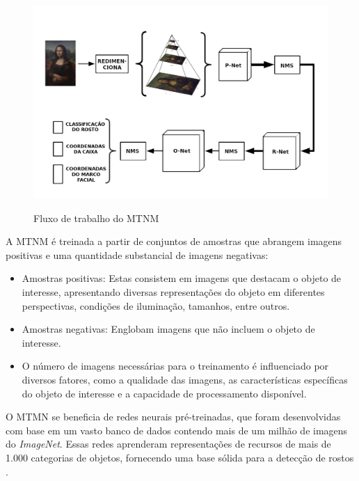 \begin{figure}[h!]
    \centering
    \caption{Fluxo de trabalho do MTNM}
    \includegraphics[scale=0.34]{figuras/mtmn.png}
    \label{fig:mtmn}
    \centering
\end{figure}

A MTNM é treinada a partir de conjuntos de amostras que abrangem imagens positivas e 
uma quantidade substancial de imagens negativas:

\begin{itemize}
    \item  Amostras positivas: Estas consistem em imagens que destacam o objeto 
    de interesse, apresentando diversas representações do objeto em diferentes 
    perspectivas, condições de iluminação, tamanhos, entre outros.
  
    \item Amostras negativas: Englobam imagens que não incluem o objeto de interesse.
    
    \item O número de imagens necessárias para o treinamento é influenciado por 
    diversos fatores, como a qualidade das imagens, as características específicas 
    do objeto de interesse e a capacidade de processamento disponível.
\end{itemize}

O MTMN se beneficia de redes neurais pré-treinadas, 
que foram desenvolvidas com base em um vasto banco de 
dados contendo mais de um milhão de imagens do \textit{ImageNet}. 
Essas redes aprenderam representações de recursos de 
mais de 1.000 categorias de objetos, fornecendo uma 
base sólida para a detecção de rostos \cite{luna2022}.

